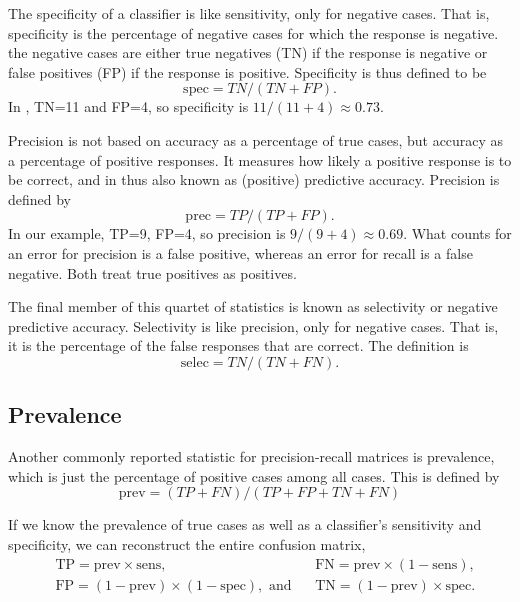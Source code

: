 The specificity of a classifier is like sensitivity, only for negative
cases.  That is, specificity is the percentage of negative cases for
which the response is negative.  the negative cases are either
true negatives (TN) if the response is negative or false positives (FP)
if the response is positive.  Specificity is thus defined to be
%
\begin{equation}
\mbox{spec} = TN/(TN+FP).
\end{equation}
%
In , TN=11 and FP=4, so
specificity is $11/(11+4) \approx 0.73$.

Precision is not based on accuracy as a percentage of true cases, but
accuracy as a percentage of positive responses.  It measures how
likely a positive response is to be correct, and in thus also known as
(positive) predictive accuracy.  Precision is defined by
%
\begin{equation}
\mbox{prec} = TP/(TP+FP).
\end{equation}
%
In our example, TP=9, FP=4, so precision is $9/(9+4) \approx 0.69$.
What counts for an error for precision is a false positive, whereas an
error for recall is a false negative.  Both treat true positives as
positives.

The final member of this quartet of statistics is known as
selectivity or negative predictive accuracy.  Selectivity is
like precision, only for negative cases.  That is, it 
is the percentage of the false responses that are correct.  The
definition is
%
\begin{equation}
\mbox{selec} = TN/(TN+FN).
\end{equation}
%


\subsection{Prevalence}

Another commonly reported statistic for precision-recall matrices is
prevalence, which is just the percentage of positive cases among all
cases.  This is defined by
%
\begin{equation}
\mbox{prev} = (TP+FN)/(TP+FP+TN+FN)
\end{equation}
%

If we know the prevalence of true cases as well as a classifier's
sensitivity and specificity, we can reconstruct the entire confusion
matrix,
%
\begin{align}
&\mbox{TP} = \mbox{prev} \times \mbox{sens},
\ \ \ \ 
&\mbox{FN} = \mbox{prev} \times (1 - \mbox{sens}),
\\
&\mbox{FP} = (1-\mbox{prev}) \times (1-\mbox{spec}), \mbox{ and}
\ \ \ \ 
&\mbox{TN} = (1-\mbox{prev}) \times \mbox{spec}.
\end{align}


